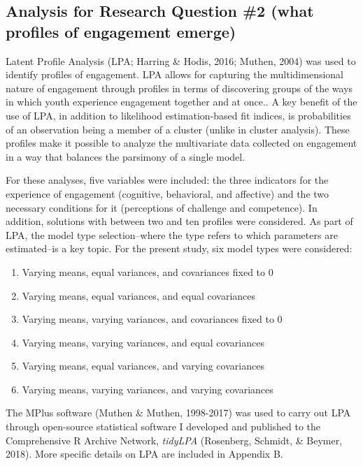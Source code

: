 \documentclass[]{msu-thesis}
\providecommand{\tightlist}{%
  \setlength{\itemsep}{0pt}\setlength{\parskip}{0pt}}
\theoremstyle{definition}
\theoremstyle{definition}
\theoremstyle{definition}
\theoremstyle{remark}
\begin{document}
\subsection{Analysis for Research Question \#2 (what profiles of
engagement
emerge)}\label{analysis-for-research-question-2-what-profiles-of-engagement-emerge}

Latent Profile Analysis (LPA; Harring \& Hodis, 2016; Muthen, 2004) was
used to identify profiles of engagement. LPA allows for capturing the
multidimensional nature of engagement through profiles in terms of
discovering groups of the ways in which youth experience engagement
together and at once.. A key benefit of the use of LPA, in addition to
likelihood estimation-based fit indices, is probabilities of an
observation being a member of a cluster (unlike in cluster analysis).
These profiles make it possible to analyze the multivariate data
collected on engagement in a way that balances the parsimony of a single
model.

For these analyses, five variables were included: the three indicators
for the experience of engagement (cognitive, behavioral, and affective)
and the two necessary conditions for it (perceptions of challenge and
competence). In addition, solutions with between two and ten profiles
were considered. As part of LPA, the model type selection--where the
type refers to which parameters are estimated--is a key topic. For the
present study, six model types were considered:

\begin{enumerate}
\def\labelenumi{\arabic{enumi}.}
\tightlist
\item
  Varying means, equal variances, and covariances fixed to 0
\item
  Varying means, equal variances, and equal covariances
\item
  Varying means, varying variances, and covariances fixed to 0
\item
  Varying means, varying variances, and equal covariances
\item
  Varying means, equal variances, and varying covariances
\item
  Varying means, varying variances, and varying covariances
\end{enumerate}

The MPlus software (Muthen \& Muthen, 1998-2017) was used to carry out
LPA through open-source statistical software I developed and published
to the Comprehensive R Archive Network, \emph{tidyLPA} (Rosenberg,
Schmidt, \& Beymer, 2018). More specific details on LPA are included in
Appendix B.
\end{document}
